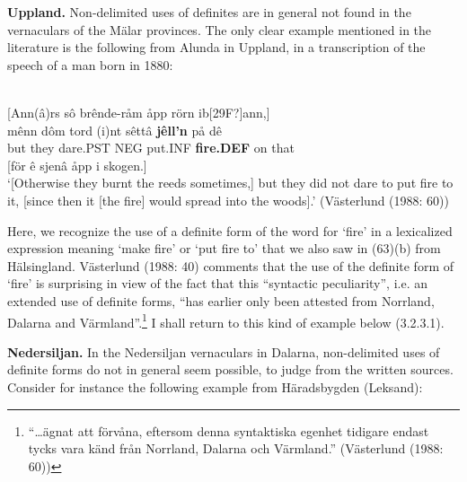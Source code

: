 \z

\textbf{Uppland. }Non-delimited uses of definites are in general not found in the vernaculars of the Mälar provinces. The only clear example mentioned in the literature is the following from Alunda in Uppland, in a transcription of the speech of a man born in 1880:


\ea \label{} 
\\ \label{bkm:Ref154222780}
 {}[Ann(â)rs sô brênde-råm åpp rörn ib[29F?]ann,] \\
\gll mênn  dôm  tord  (i)nt  sêttâ  \textbf{jêll’n} på  dê  \\
but  they  dare.PST  NEG  put.INF  \textbf{fire.DEF} on   that  \\
{} [för ê sjenâ åpp i skogen.]\\
\glt ‘[Otherwise they burnt the reeds sometimes,] but they did not dare to put fire to it, [since then it [the fire] would spread into the woods].’ (Västerlund (1988: 60))

\z

Here, we recognize the use of a definite form of the word for ‘fire’ in a lexicalized expression meaning ‘make fire’ or ‘put fire to’ that we also saw in (63)(b) from Hälsingland. Västerlund (1988: 40) comments that the use of the definite form of  ‘fire’ is surprising in view of the fact that this “syntactic peculiarity”, i.e. an extended use of definite forms, “has earlier only been attested from Norrland, Dalarna and Värmland”.\footnote{ “…ägnat att förvåna, eftersom denna syntaktiska egenhet tidigare endast tycks vara känd från Norrland, Dalarna och Värmland.” (Västerlund (1988: 60))} I shall return to this kind of example below (3.2.3.1).


\textbf{Nedersiljan.} In the Nedersiljan vernaculars in Dalarna, non-delimited uses of definite forms do not in general seem possible, to judge from the written sources. Consider for instance the following example from Häradsbygden (Leksand):


